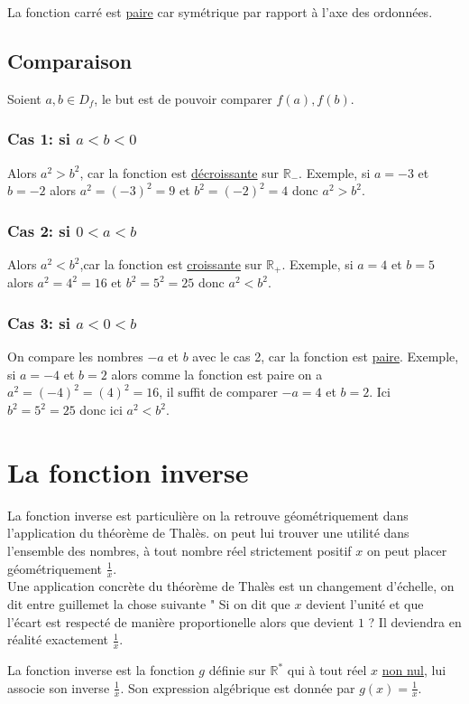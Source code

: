 \documentclass[french]{book}
\begin{document}
\begin{prop}
La fonction carré est \underline{paire} car symétrique par rapport à l'axe des ordonnées.
\end{prop}

\subsection*{Comparaison}
Soient $a,b \in D_f$, le but est de pouvoir comparer $f(a),f(b)$.
\subsubsection*{Cas 1: si $a<b<0$}
Alors $a^2>b^2$, car la fonction est \underline{décroissante} sur $\mathbb{R}_-$. Exemple, si $a=-3$ et $b=-2$ alors $a^2=(-3)^2=9$ et $b^2=(-2)^2=4$ donc $a^2 > b^2$.
\subsubsection*{Cas 2: si  $0<a<b$}
Alors $a^2<b^2$,car la fonction est \underline{croissante} sur $\mathbb{R}_+$. Exemple, si $a=4$ et $b=5$ alors $a^2=4^2=16$ et $b^2=5^2=25$ donc $a^2 < b^2$.
\subsubsection*{Cas 3: si $a<0<b$}
On compare les nombres $-a$ et $b$ avec le cas 2, car la fonction est \underline{paire}. Exemple, si $a=-4$ et $b=2$ alors comme la fonction est paire on a $a^2=(-4)^2=(4)^2=16$, il suffit de comparer $-a=4$ et $b=2$. Ici $b^2=5^2=25$ donc ici $a^2 < b^2$.

\section{La fonction inverse}

La fonction inverse est particulière on la retrouve géométriquement dans l'application du théorème de Thalès. on peut lui trouver une utilité dans l'ensemble des nombres, à tout nombre réel strictement positif $x$ on peut placer géométriquement $\frac{1}{x}$. \\

Une application concrète du théorème de Thalès est un changement d'échelle, on dit entre guillemet la chose suivante " Si on dit que $x$ devient l'unité et que l'écart est respecté de manière proportionelle alors que devient $1$ ? Il deviendra en réalité exactement $\frac{1}{x}$.

\begin{defn}
La fonction inverse est la fonction $g$ définie sur $\mathbb{R}^*$ qui à tout réel $x$ \underline{non nul}, lui associe son inverse $\frac{1}{x}$. Son expression algébrique est donnée par $g(x)=\frac{1}{x}$.
\end{defn}
\end{document}
